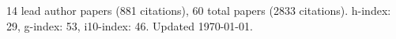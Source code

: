 14 lead author papers (881 citations),
60 total papers (2833 citations).\newline
h-index: 29, g-index: 53, i10-index: 46. Updated \today.